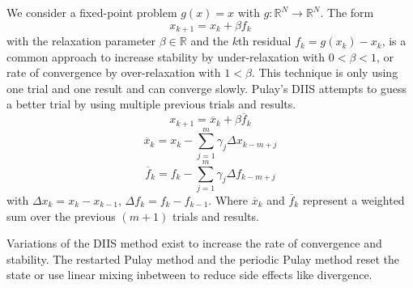 We consider a fixed-point problem \(g(x) = x\) with \(g\colon \mathbb{R}^N \to \mathbb{R}^N\). The form \[x_{k+1} = x_k + \beta f_k\] with the relaxation parameter \(\beta \in \mathbb{R}\) and the \(k\)th residual \(f_k = g(x_k) - x_k\), is a common approach to increase stability by under-relaxation with \(0 < \beta < 1\), or rate of convergence by over-relaxation with \(1 < \beta\). This technique is only using one trial and one result and can converge slowly. Pulay's DIIS attempts to guess a better trial by using multiple previous trials and results. \[x_{k+1} = \overline{x}_k + \beta \overline{f}_k\] \[\overline{x}_{k} = x_k - \sum_{j=1}^{m} \gamma_j {\Delta x}_{k-m+j}\] \[\overline{f}_{k} = f_k - \sum_{j=1}^{m} \gamma_j {\Delta f}_{k-m+j}\] with \({\Delta x}_{k} = x_k - x_{k-1}\), \({\Delta f}_{k} = f_k - f_{k-1}\). Where \(\overline{x}_{k}\) and \(\overline{f}_{k}\) represent a weighted sum over the previous \((m+1)\) trials and results.

Variations of the DIIS method exist to increase the rate of convergence and stability. The restarted Pulay method\cite{diis_restarted} and the periodic Pulay method\cite{diis_periodic} reset the state or use linear mixing inbetween to reduce side effects like divergence.

